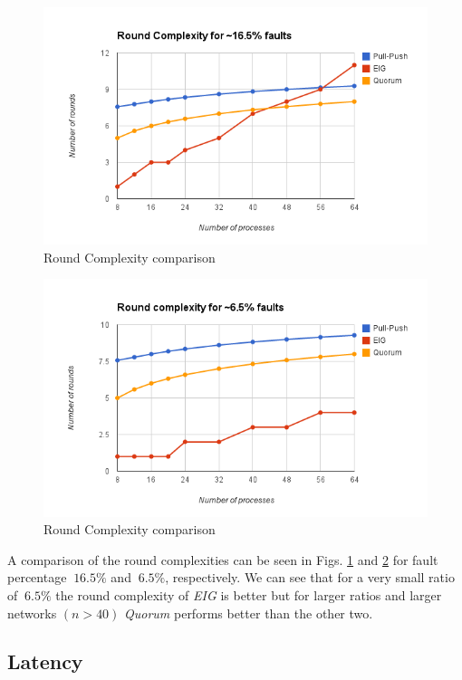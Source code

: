 \begin{figure}[ht]
 \centering
\includegraphics[scale=0.4]{Round16}
\caption{Round Complexity comparison}
 \label{fig:round16}
\vspace{-2mm}
\end{figure}

\begin{figure}[ht]
 \centering
\includegraphics[scale=0.4]{Round6}
\caption{Round Complexity comparison}
 \label{fig:round6}
\vspace{-2mm}
\end{figure}

A comparison of the round complexities can be seen in Figs. \ref{fig:round16} and \ref{fig:round6} for fault percentage $~16.5\%$ and $~6.5\%$, respectively. We can see that for a very small ratio of $~6.5\%$ the round complexity of \textit{EIG} is better but for larger ratios and larger networks $(n > 40)$ \textit{Quorum} performs better than the other two. 


\subsection{Latency}


